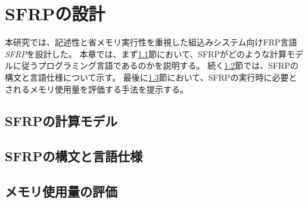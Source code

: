 \chapter{SFRPの設計}\label{sec:language}
本研究では、記述性と省メモリ実行性を重視した組込みシステム向けFRP言語{\it SFRP}を設計した。
本章では、まず\ref{sec:language:model}節において、SFRPがどのような計算モデルに従うプログラミング言語であるのかを説明する。
続く\ref{sec:language:syntax}節では、SFRPの構文と言語仕様について示す。
最後に\ref{sec:language:memory}節において、SFRPの実行時に必要とされるメモリ使用量を評価する手法を提示する。

\section{SFRPの計算モデル}\label{sec:language:model}


\section{SFRPの構文と言語仕様}\label{sec:language:syntax}


\section{メモリ使用量の評価}\label{sec:language:memory}

